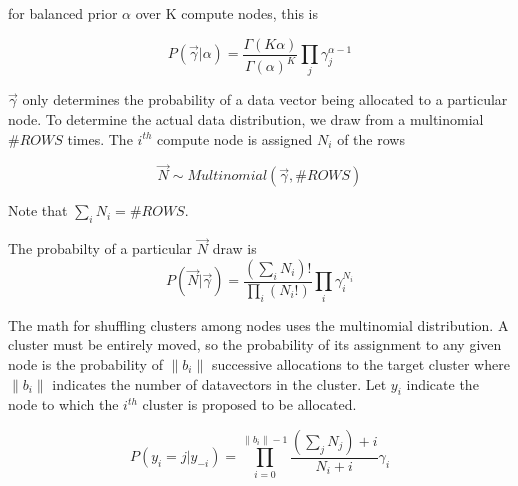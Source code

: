 \documentclass{article}
\begin{document}
for balanced prior $\alpha$ over K compute nodes, this is

\begin{equation}
P(\vec \gamma|\alpha) = \frac{\Gamma(K \alpha)}{\Gamma(\alpha)^K} \prod_j \gamma_j^{\alpha-1}
\end{equation}

$\vec \gamma$ only determines the probability of a data vector being allocated to a particular node.  To determine the actual data distribution, we draw from a multinomial $\#ROWS$ times.  The $i^{th}$ compute node is assigned ${N_i}$ of the rows

\begin{equation}
\vec N \sim Multinomial(\vec \gamma,\#ROWS)
\end{equation}

Note that $\sum_i N_i = \#ROWS$.

The probabilty of a particular $\vec N$ draw is
\begin{equation}
P(\vec N|\vec \gamma) = \frac{(\sum_i N_i)!}{\prod_i (N_i!)} \prod_i \gamma_i^{N_i}
\end{equation}

The math for shuffling clusters among nodes uses the multinomial distribution.  A cluster must be entirely moved, so the probability of its assignment to any given node is the probability of $\|b_i\|$ successive allocations to the target cluster where $\|b_i\|$ indicates the number of datavectors in the cluster.  Let $y_i$ indicate the node to which the $i^{th}$ cluster is proposed to be allocated.

\begin{equation}
P(y_i=j|y_{-i}) = \prod_{i=0}^{\|b_i\|-1} \frac{(\sum_j N_j)+i}{N_i + i} \gamma_i
\end{equation}
\end{document}
